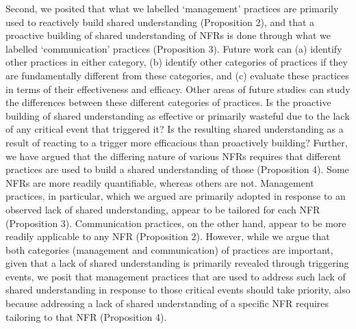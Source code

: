 \documentclass[smallextended]{svjour3}
\begin{document}
Second, we posited that what we labelled `management' practices are primarily used to reactively build shared understanding (Proposition 2), and that a proactive building of shared understanding of NFRs is done through what we labelled `communication' practices (Proposition 3). Future work can (a) identify other practices in either category, (b) identify other categories of practices if they are fundamentally different from these categories, and (c) evaluate these practices in terms of their effectiveness and efficacy. 
Other areas of future studies can study the differences between these different categories of practices.
Is the proactive building of shared understanding as effective or primarily wasteful due to the lack of any critical event that triggered it? 
Is the resulting shared understanding as a result of reacting to a trigger more efficacious than proactively building?
Further, we have argued that the differing nature of various NFRs requires that different practices are used to build a shared understanding of those (Proposition 4). Some NFRs are more readily quantifiable, whereas others are not. Management practices, in particular, which we argued are primarily adopted in response to an observed lack of shared understanding, appear to be tailored for each NFR (Proposition 3). Communication practices, on the other hand, appear to be more readily applicable to any NFR (Proposition 2). However, while we argue that both categories (management and communication) of practices are important, given that a lack of shared understanding is primarily revealed through triggering events, we posit that management practices that are used to address such lack of shared understanding in response to those critical events should take priority, also because addressing a lack of shared understanding of a specific NFR requires tailoring to that NFR (Proposition 4).
\end{document}
